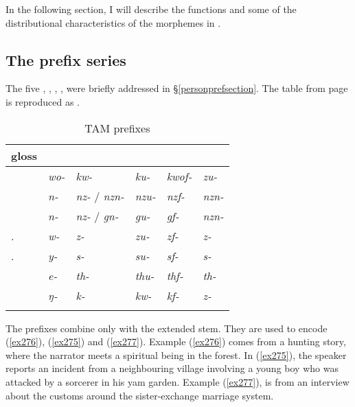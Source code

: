 In the following section, I will describe the functions and some of the distributional characteristics of the morphemes in .

\subsection{The prefix series} \label{tamprefixseries}

The five  \Alph, \Bet, \Betaone, \Betatwo, \Gam{} were briefly addressed in {\S}\ref{personprefsection}. The table from page \pageref{perspref} is reproduced as .

\begin{table}
\caption{TAM prefixes}
\label{perspref2}
	\begin{tabularx}{\textwidth}{XXXXXl}
		\lsptoprule
		{gloss} &\Alph &\Bet &\Betaone &\Betatwo	&\Gam\\\midrule
		\Fsg &\emph{wo-} &\emph{kw-} &\emph{ku-} &\emph{kwof-} &\emph{zu-}\\
		\Fnsg &\emph{n-} &\emph{nz-} / \emph{nzn-} &\emph{nzu-} &\emph{nzf-} &\emph{nzn-}\\
		\Ssg &\emph{n-} &\emph{nz-} / \emph{gn-} &\emph{gu-} &\emph{gf-} &\emph{nzn-}\\
		\Tsg.\F &\emph{w-} &\emph{z-} &\emph{zu-} &\emph{zf-} &\emph{z-}\\
		\Tsg.\Masc &\emph{y-} &\emph{s-} &\emph{su-} &\emph{sf-} &\emph{s-}	\\
		\Stnsg &\emph{e-} &\emph{th-} &\emph{thu-} &\emph{thf-} &\emph{th-}\\
		\M &\emph{ŋ-} &\emph{k-} &\emph{kw-} &\emph{kf-} &\emph{z-}\\
		\lspbottomrule
	\end{tabularx}
\end{table}%

The \Alph{} prefixes combine only with the extended stem. They are used to encode  (\ref{ex276}),   (\ref{ex275}) and   (\ref{ex277}). Example (\ref{ex276}) comes from a hunting story, where the narrator meets a spiritual being in the forest. In (\ref{ex275}), the speaker reports an incident from a neighbouring village involving a young boy who was attacked by a sorcerer in his yam garden. Example (\ref{ex277}), is from an interview about the customs around the sister-exchange marriage system.

